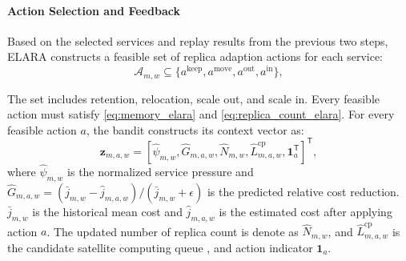 \documentclass[10pt, conference, letterpaper]{IEEEtran}
\begin{document}
\paragraph{Action Selection and Feedback}
Based on the selected services and replay results from the previous two steps, ELARA constructs a  feasible set of replica adaption actions for each service:
\begin{equation}
\mathcal A_{m,w}\subseteq
\{a^{\text{keep}},a^{\text{move}},a^{\text{out}},a^{\text{in}}\},
\label{eq:new_bandit_actions}
\end{equation}

The set includes retention, relocation, scale out, and scale in. Every feasible action must satisfy \eqref{eq:memory_elara} and \eqref{eq:replica_count_elara}.
For every feasible action $a$, the bandit constructs its context vector as:
\begin{equation}
\mathbf z_{m,a,w}=\left[ \widehat\psi_{m,w}, \widehat G_{m,a,w}, \widehat N_{m,w}, \widehat L_{m,a,w}^{\text{cp}}, \mathbf 1_a^{\mathsf T}\right]^{\mathsf T},
\label{eq:new_bandit_context}
\end{equation}
where $\widehat\psi_{m,w}$ is the normalized service pressure and $\widehat G_{m,a,w}=(\bar j_{m,w}-\widehat j_{m,a,w})/(\bar j_{m,w}+\epsilon)$ is the predicted relative cost reduction. $\bar j_{m,w}$ is the historical mean cost and $\widehat j_{m,a,w}$ is the estimated cost after applying action $a$. 
The updated number of replica count is denote as $\widehat N_{m,w}$, and $\widehat L_{m,a,w}^{\text{cp}}$ is the candidate satellite computing queue , and action indicator $\mathbf 1_a$. 
\end{document}
